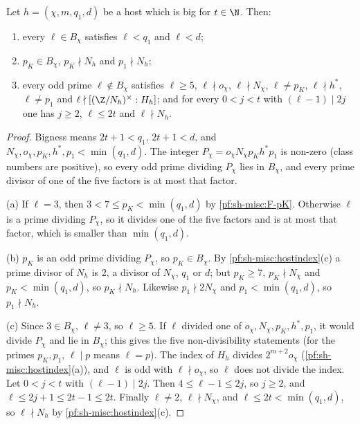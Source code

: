 \begin{lemma}\label{pf:sh-misc:bchi}
Let $h=(\chi,m,q_1,d)$ be a host which is big for $t\in\N$. Then:
\begin{enumerate}[label=(\alph*)]
\item every $\ell\in B_\chi$ satisfies $\ell<q_1$ and $\ell<d$;
\item $p_K\in B_\chi$, $p_K\nmid N_h$ and $p_1\nmid N_h$;
\item every odd prime $\ell\notin B_\chi$ satisfies $\ell\ge5$, $\ell\nmid o_\chi$, $\ell\nmid N_\chi$, $\ell\ne p_K$, $\ell\nmid h^*$, $\ell\ne p_1$ and
$\ell\nmid[(\Z/N_h)^\times:H_h]$; and for every $0<j<t$ with $(\ell-1)\mid2j$ one has $j\ge2$, $\ell\le2t$ and $\ell\nmid N_h$.
\end{enumerate}
\end{lemma}

\begin{proof}
Bigness means $2t+1<q_1$, $2t+1<d$, and $N_\chi,o_\chi,p_K,h^*,p_1<\min(q_1,d)$. The integer $P_\chi=o_\chi N_\chi p_Kh^*p_1$ is
non-zero (class numbers are positive), so every odd prime dividing $P_\chi$ lies in $B_\chi$, and every prime divisor of one of the
five factors is at most that factor.

(a) If $\ell=3$, then $3<7\le p_K<\min(q_1,d)$ by \ref{pf:sh-misc:F-pK}. Otherwise $\ell$ is a prime dividing $P_\chi$, so it divides
one of the five factors and is at most that factor, which is smaller than $\min(q_1,d)$.

(b) $p_K$ is an odd prime dividing $P_\chi$, so $p_K\in B_\chi$. By \cref{pf:sh-misc:hostindex}(c) a prime divisor of $N_h$ is $2$, a
divisor of $N_\chi$, $q_1$ or $d$; but $p_K\ge7$, $p_K\nmid N_\chi$ and $p_K<\min(q_1,d)$, so $p_K\nmid N_h$. Likewise $p_1\nmid2N_\chi$
and $p_1<\min(q_1,d)$, so $p_1\nmid N_h$.

(c) Since $3\in B_\chi$, $\ell\ne3$, so $\ell\ge5$. If $\ell$ divided one of $o_\chi,N_\chi,p_K,h^*,p_1$, it would divide $P_\chi$ and lie in
$B_\chi$; this gives the five non-divisibility statements (for the primes $p_K,p_1$, $\ell\mid p$ means $\ell=p$). The index of $H_h$
divides $2^{m+2}o_\chi$ (\cref{pf:sh-misc:hostindex}(a)), and $\ell$ is odd with $\ell\nmid o_\chi$, so $\ell$ does not divide the index.
Let $0<j<t$ with $(\ell-1)\mid2j$. Then $4\le\ell-1\le2j$, so $j\ge2$, and $\ell\le2j+1\le2t-1\le2t$. Finally $\ell\ne2$,
$\ell\nmid N_\chi$, and $\ell\le2t<\min(q_1,d)$, so $\ell\nmid N_h$ by \cref{pf:sh-misc:hostindex}(c).
\end{proof}

